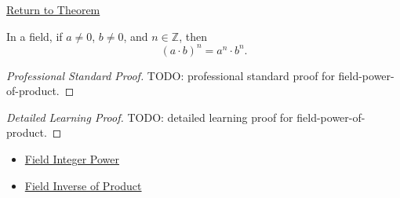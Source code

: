 \newpage
{}
\label{prf:field-power-of-product}

\begin{remark*}[Return]
\hyperref[cor:inverse-of-product-on-q]{Return to Theorem}
\end{remark*}

\begin{theorem*}
In a field, if $a\ne0$, $b\ne0$, and $n\in\mathbb{Z}$, then
\[
(a\cdot b)^n=a^n\cdot b^n.
\]
\end{theorem*}

\begin{proof}[Professional Standard Proof]
\LRAProofBodyStart
TODO: professional standard proof for field-power-of-product.
\end{proof}

\begin{proof}[Detailed Learning Proof]
\LRAProofBodyStart
TODO: detailed learning proof for field-power-of-product.
\end{proof}

\begin{remark*}
\end{remark*}

\begin{dependencies}
\begin{itemize}
  \item \hyperref[def:two-sided-inverse]{Field Integer Power}
  \item \hyperref[thm:field-inverse-of-product]{Field Inverse of Product}
\end{itemize}
\end{dependencies}

\clearpage
